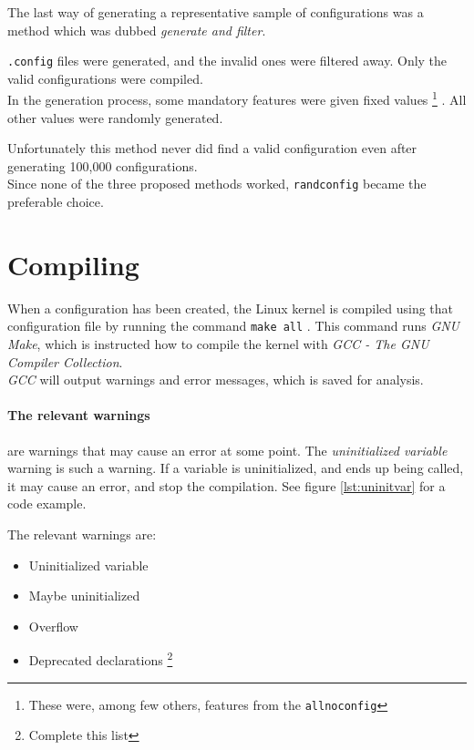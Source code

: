 \documentclass[a4paper,11pt]{report}
\newcommand{\textcode}[1]{
    \fboxsep=1pt
    \texttt{\colorbox{gray!20}{#1}}
}
\begin{document}
The last way of generating a representative sample of configurations was a 
method which was dubbed \emph{generate and filter}. 

\texttt{.config} files were generated, and the invalid ones were 
filtered away. Only the valid configurations were compiled.
\\

In the generation process, some mandatory features were given fixed values
    \footnote{These were, among few others, features from the 
    \texttt{allnoconfig}}
. All other values were randomly generated.

Unfortunately this method never did find a valid configuration even after 
generating 100,000 configurations.
\\

Since none of the three proposed methods worked, \texttt{randconfig} became the 
preferable choice.


\section{Compiling}
When a configuration has been created, the Linux kernel is compiled using 
that configuration file by running the command \textcode{make all}. This 
command runs \emph{GNU Make}, which is instructed how to compile the kernel with
\emph{GCC - The GNU Compiler Collection}.
\\

\emph{GCC} will output warnings and error messages, which is saved for analysis.




\iffalse %
    \paragraph{The relevant warnings}
are warnings that may cause an error at some point. The \emph{uninitialized 
variable} warning is such a warning. If a variable is uninitialized, and ends 
up being called, it may cause an error, and stop the compilation. See figure 
\ref{lst:uninitvar} for a code example.

The relevant warnings are:

\begin{itemize}
    \item Uninitialized variable
    \item Maybe uninitialized
    \item Overflow
    \item Deprecated declarations
        \footnote{Complete this list}
\end{itemize}
\end{document}
